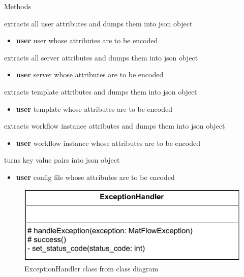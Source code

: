 \begin{methodenv}{Methods}

extracts all user attributes and dumps them into json object
\begin{itemize}
        \item \textbf{user}
        user whose attributes are to be encoded
\end{itemize}

extracts all server attributes and dumps them into json object
\begin{itemize}
        \item \textbf{user}
        server whose attributes are to be encoded
\end{itemize}

extracts template attributes and dumps them into json object
\begin{itemize}
        \item \textbf{user}
        template whose attributes are to be encoded
\end{itemize}

extracts workflow instance attributes and dumps them into json object
\begin{itemize}
        \item \textbf{user}
        workflow instance whose attributes are to be encoded
\end{itemize}

turns key value pairs into json object
\begin{itemize}
        \item \textbf{user}
        config file whose attributes are to be encoded
\end{itemize}

\end{methodenv}


\begin{figure}[h]
        \centerline{\includegraphics[scale=1]{res/Klassen/ExceptionHandler.pdf}}
        \caption{ExceptionHandler class from class diagram}
\end{figure}

